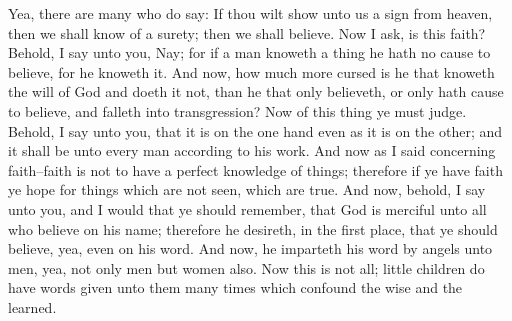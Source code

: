 \bverse \iffalse Yea, there are many who do say: If thou wilt show unto us a sign from heaven, then we shall know of a surety; then we shall believe. \fi
Yea, there are many who do say: If thou wilt show unto us a sign from heaven, then we shall know of a surety; then we shall believe.
\bverse \iffalse Now I ask, is this faith? Behold, I say unto you, Nay; for if a man knoweth a thing he hath no cause to believe, for he knoweth it. \fi
Now I ask, is this faith? Behold, I say unto you, Nay; for if a man knoweth a thing he hath no cause to believe, for he knoweth it.
\bverse \iffalse And now, how much more cursed is he that knoweth the will of God and doeth it not, than he that only believeth, or only hath cause to believe, and falleth into transgression? \fi
And now, how much more cursed is he that knoweth the will of God and doeth it not, than he that only believeth, or only hath cause to believe, and falleth into transgression?
\bverse \iffalse Now of this thing ye must judge. Behold, I say unto you, that it is on the one hand even as it is on the other; and it shall be unto every man according to his work. \fi
Now of this thing ye must judge. Behold, I say unto you, that it is on the one hand even as it is on the other; and it shall be unto every man according to his work.
\bverse \iffalse And now as I said concerning faith--faith is not to have a perfect knowledge of things; therefore if ye have faith ye hope for things which are not seen, which are true. \fi
And now as I said concerning faith--faith is not to have a perfect knowledge of things; therefore if ye have faith ye hope for things which are not seen, which are true.
\bverse \iffalse And now, behold, I say unto you, and I would that ye should remember, that God is merciful unto all who believe on his name; therefore he desireth, in the first place, that ye should believe, yea, even on his word. \fi
And now, behold, I say unto you, and I would that ye should remember, that God is merciful unto all who believe on his name; therefore he desireth, in the first place, that ye should believe, yea, even on his word.
\bverse \iffalse And now, he imparteth his word by angels unto men, yea, not only men but women also. Now this is not all; little children do have words given unto them many times which confound the wise and the learned. \fi
And now, he imparteth his word by angels unto men, yea, not only men but women also. Now this is not all; little children do have words given unto them many times which confound the wise and the learned.
